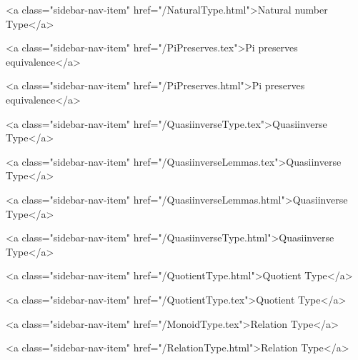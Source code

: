       
        
          <a class="sidebar-nav-item" href="/NaturalType.html">Natural number Type</a>
        
      
    
      
        
          <a class="sidebar-nav-item" href="/PiPreserves.tex">Pi preserves equivalence</a>
        
      
    
      
        
          <a class="sidebar-nav-item" href="/PiPreserves.html">Pi preserves equivalence</a>
        
      
    
      
        
          <a class="sidebar-nav-item" href="/QuasiinverseType.tex">Quasiinverse Type</a>
        
      
    
      
        
          <a class="sidebar-nav-item" href="/QuasiinverseLemmas.tex">Quasiinverse Type</a>
        
      
    
      
        
          <a class="sidebar-nav-item" href="/QuasiinverseLemmas.html">Quasiinverse Type</a>
        
      
    
      
        
          <a class="sidebar-nav-item" href="/QuasiinverseType.html">Quasiinverse Type</a>
        
      
    
      
        
          <a class="sidebar-nav-item" href="/QuotientType.html">Quotient Type</a>
        
      
    
      
        
          <a class="sidebar-nav-item" href="/QuotientType.tex">Quotient Type</a>
        
      
    
      
        
          <a class="sidebar-nav-item" href="/MonoidType.tex">Relation Type</a>
        
      
    
      
        
          <a class="sidebar-nav-item" href="/RelationType.html">Relation Type</a>
        
